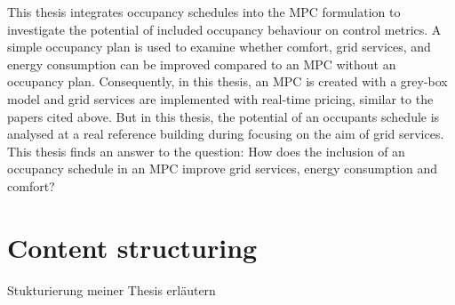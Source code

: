     This thesis integrates occupancy schedules into the MPC formulation to investigate the potential of included occupancy behaviour on control metrics. A simple occupancy plan is used to examine whether comfort, grid services, and energy consumption can be improved compared to an MPC without an occupancy plan. Consequently, in this thesis, an MPC is created with a grey-box model and grid services are implemented with real-time pricing, similar to the papers cited above. But in this thesis, the potential of an occupants schedule is analysed at a real reference building during focusing on the aim of grid services. This thesis finds an answer to the question: How does the inclusion of an occupancy schedule in an MPC improve grid services, energy consumption and comfort? 

\section{Content structuring}
\label{section:contentstructuring}
Stukturierung meiner Thesis erläutern

